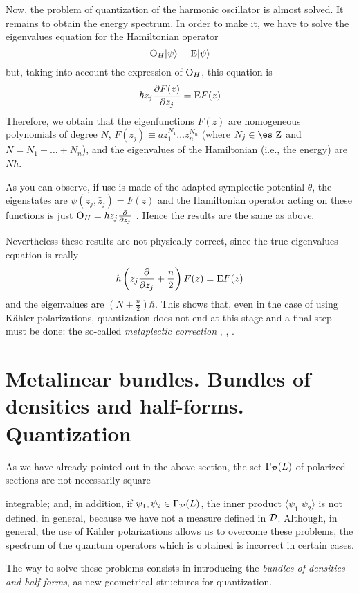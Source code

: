 \documentclass[12pt]{article}
\theoremstyle{plain}
\def\dst{\(}
\def\derpar#1#2{\frac{\partial{#1}}{\partial{#2}}}
\def\P{{\cal P}}
\def\D{{\cal D}}
\def\sta{|\psi \rangle }
\def\Op{{\rm O}}
\def\Zahl{\mbox{\es Z}}
\begin{document}
Now, the problem of quantization of the harmonic oscillator
is almost solved. It remains to obtain the
energy spectrum. In order to make it,
we have to solve the eigenvalues equation
for the Hamiltonian operator
$$
\Op_H \sta = {\rm E} \sta
$$
but, taking into account the expression of $\Op_H$,
this equation is
$$
\hbar z_j \derpar{F(z)}{z_j} = {\rm E} F(z)
$$
Therefore, we obtain that
the eigenfunctions $F(z)$ are homogeneous polynomials
of degree $N$, $F(z_j) \equiv a z_1^{N_1}\ldots z_n^{N_n}$
(where $N_j \in \Zahl$ and $N=N_1+\ldots +N_n$), and
the eigenvalues of the Hamiltonian
(i.e., the energy) are $N\hbar$.

As you can observe, if use is made of the adapted symplectic potential
$\theta$, the eigenstates are
$\psi (z_j,\bar z_j) = F(z)$
and the Hamiltonian operator acting on these functions is just
\dst\Op_H = \hbar z_j \derpar{}{z_j}\) .
Hence the results are the same as above.

Nevertheless these results are not physically correct,
since the true eigenvalues equation is really
$$
\hbar\left(z_j \derpar{}{z_j} +\frac{n}{2}\right)F(z) = {\rm E} F(z)
$$
and the eigenvalues are $(N+\frac{n}{2})\hbar$.
This shows that, even in the case of using
K\"ahler polarizations, quantization does not end
at this stage and a final step must be done:
the so-called {\it metaplectic correction}
\cite{Sn-80}, \cite{Tu-85}, \cite{Wo-80}.



\section{Metalinear bundles. Bundles of densities and half-forms.
\\ Quantization}


As we have already pointed out in the above section,
the set $\Gamma_\P (L)$ of polarized sections are not necessarily square

integrable;
and, in addition, if $\psi_1,\psi_2 \in \Gamma_\P (L)$,
the inner product $\langle \psi_1 | \psi_2 \rangle$
is not defined, in general, because we have not
a measure defined in $\D$.
Although, in general, the use of K\"ahler polarizations
allows us to overcome these problems, the spectrum of the quantum
operators
which is obtained is incorrect in certain cases.

The way to solve these problems consists in introducing
the {\it bundles of densities and half-forms}, as new geometrical
structures
for quantization.
\end{document}
